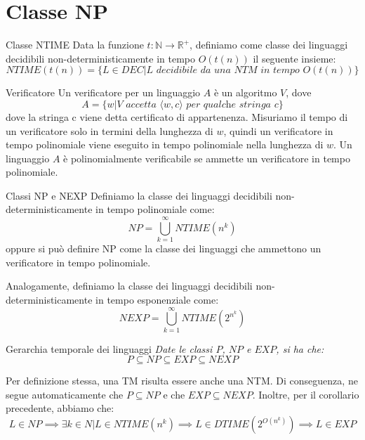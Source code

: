 \section{Classe NP}
\begin{Definition}{Classe NTIME}{}
Data la funzione $t : \mathbb{N}\to\mathbb{R}^+$, definiamo come classe dei linguaggi decidibili non-deterministicamente in tempo $O(t(n))$ il seguente insieme:
\begin{equation*}
    NTIME(t(n)) = \{L\in DEC | L\textit{ decidibile da una NTM in tempo }O(t(n))\}
\end{equation*}
\end{Definition}

\begin{Definition}{Verificatore}{}
Un verificatore per un linguaggio $A$ è un algoritmo $V$, dove
\begin{equation*}
    A=\{w|V\textit{ accetta }\langle w, c\rangle\textit{ per qualche stringa }c\}
\end{equation*}
dove la stringa c viene detta certificato di appartenenza. Misuriamo il tempo di un verificatore solo in termini della lunghezza di $w$, quindi un verificatore in tempo polinomiale viene eseguito in tempo polinomiale nella lunghezza di $w$. Un linguaggio $A$ è polinomialmente verificabile se ammette un verificatore in tempo polinomiale.
\end{Definition}

\begin{Definition}{Classi NP e NEXP}{}
Definiamo la classe dei linguaggi decidibili non-deterministicamente in tempo polinomiale come:
\begin{equation*}
NP = \bigcup^\infty_{k=1}NTIME(n^k)
\end{equation*}
oppure si può definire NP come la classe dei linguaggi che ammettono un verificatore in tempo polinomiale.

Analogamente, definiamo la classe dei linguaggi decidibili non-deterministicamente in tempo esponenziale come:
\begin{equation*}
NEXP = \bigcup^\infty_{k=1}NTIME(2^{n^k})
\end{equation*}
\end{Definition}

\begin{Corollario}{Gerarchia temporale dei linguaggi}{}\label{cor:gerarchia-temp-ling}
\textit{Date le classi $P$, $NP$ e $EXP$, si ha che:}
\begin{equation*}
    P \subseteq NP \subseteq EXP \subseteq NEXP
\end{equation*}
\begin{demonstration}
Per definizione stessa, una TM risulta essere anche una NTM. Di conseguenza, ne segue automaticamente che $P \subseteq NP$ e che $EXP \subseteq NEXP$. Inoltre, per il corollario precedente, abbiamo che:
\begin{equation*}
    L \in NP\implies \exists k \in N | L \in NTIME(n^k)\implies L \in DTIME(2^{O(n^k)})\implies L \in EXP
\end{equation*}
\end{demonstration}
\end{Corollario}

